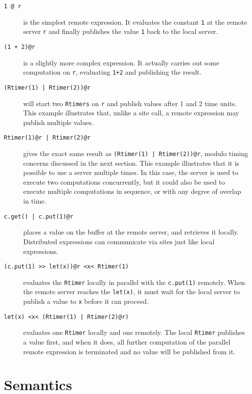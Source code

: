 \documentclass[10pt,letterpaper]{article}
\begin{document}
\begin{description}
\item[\texttt{1 @ r}] is the simplest remote expression. It evaluates the constant
\texttt{1} at the remote server \texttt{r} and finally publishes the value
\texttt{1} back to the local server.

\item[\texttt{(1 + 2)@r}] is a slightly more complex expression. It actually carries
out some computation on \texttt{r}, evaluating \texttt{1+2} and publishing the
result.

\item[\texttt{(Rtimer(1) | Rtimer(2))@r}] will start two \texttt{Rtimers} on
\texttt{r} and publish values after 1 and 2 time units. This example
illustrates that, unlike a site call, a remote expression may publish multiple
values.

\item[\texttt{Rtimer(1)@r | Rtimer(2)@r}] gives the exact same result as
\texttt{(Rtimer(1) | Rtimer(2))@r}, modulo timing concerns discussed in the
next section. This example illustrates that it is possible to use a server
multiple times. In this case, the server is used to execute two computations
concurrently, but it could also be used to execute multiple computations in
sequence, or with any degree of overlap in time.

\item[\texttt{c.get() | c.put(1)@r}] places a value on the buffer at the remote
server, and retrieves it locally. Distributed expressions can communicate via
sites just like local expressions.

\item[\texttt{(c.put(1) >> let(x))@r <x< Rtimer(1)}] evaluates the \texttt{Rtimer}
locally in parallel with the \texttt{c.put(1)} remotely. When the remote
server reaches the \texttt{let(x)}, it must wait for the local server to
publish a value to \texttt{x} before it can proceed.

\item[\texttt{let(x) <x< (Rtimer(1) | Rtimer(2)@r)}] evaluates one \texttt{Rtimer}
locally and one remotely. The local \texttt{Rtimer} publishes a value first,
and when it does, all further computation of the parallel remote expression is
terminated and no value will be published from it.
\end{description}

\section{Semantics}
\end{document}
